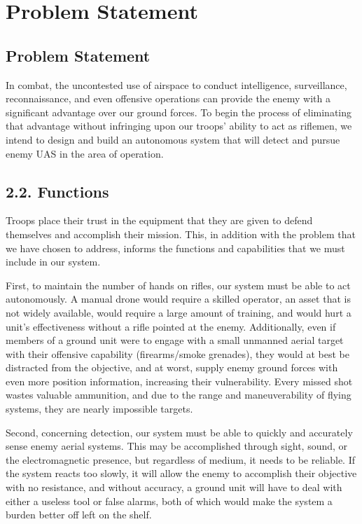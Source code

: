 \documentclass[10pt]{article}
\begin{document}
\section{Problem Statement}

\subsection{Problem Statement}
In combat, the uncontested use of airspace to conduct intelligence, surveillance, reconnaissance, and even offensive operations can provide the enemy with a significant advantage over our ground forces. To begin the process of eliminating that advantage without infringing upon our troops’ ability to act as riflemen, we intend to design and build an autonomous system that will detect and pursue enemy UAS in the area of operation. 

\subsection{2.2. Functions}
Troops place their trust in the equipment that they are given to defend themselves and accomplish their mission. This, in addition with the problem that we have chosen to address, informs the functions and capabilities that we must include in our system. 

First, to maintain the number of hands on rifles, our system must be able to act autonomously. A manual drone would require a skilled operator, an asset that is not widely available, would require a large amount of training, and would hurt a unit’s effectiveness without a rifle pointed at the enemy. Additionally, even if members of a ground unit were to engage with a small unmanned aerial target with their offensive capability (firearms/smoke grenades), they would at best be distracted from the objective, and at worst, supply enemy ground forces with even more position information, increasing their vulnerability. Every missed shot wastes valuable ammunition, and due to the range and maneuverability of flying systems, they are nearly impossible targets.  

Second, concerning detection, our system must be able to quickly and accurately sense enemy aerial systems. This may be accomplished through sight, sound, or the electromagnetic presence, but regardless of medium, it needs to be reliable. If the system reacts too slowly, it will allow the enemy to accomplish their objective with no resistance, and without accuracy, a ground unit will have to deal with either a useless tool or false alarms, both of which would make the system a burden better off left on the shelf.
\end{document}
